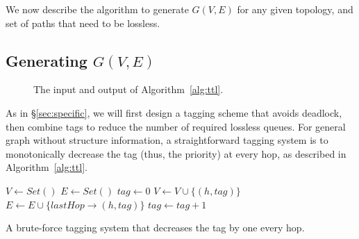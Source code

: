 We now describe the algorithm to generate $G(V,E)$ for any given topology, and set of
paths that need to be lossless. 

\subsection{Generating $G(V,E)$} 
\begin{figure}[t]
	\centering
	\caption{The input and output of Algorithm~\ref{alg:ttl}.}\label{fig:three_node}
\end{figure}

As in \S\ref{sec:specific}, we will first design a tagging scheme that avoids
deadlock, then combine tags to reduce the number of required lossless queues.
For general graph without structure information, a straightforward tagging
system is to monotonically decrease the tag (thus, the priority) at every hop,
as described in Algorithm~\ref{alg:ttl}. 

\begin{algorithm}[t]
	\small
	$V \gets Set()$\;
	$E \gets Set()$\; 
	 {
		$tag \gets 0$\;
		 {
			$V \gets V \cup \{(h, tag)\}$\;
			$E \gets E \cup \{lastHop\rightarrow(h, tag)\}$\;
			$tag \gets tag+1$\;
		}
	}
	\;
    \caption{A brute-force tagging system that decreases the tag by one every hop.}
	\label{alg:ttl}
\end{algorithm}

